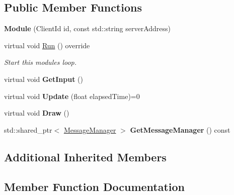 \subsection*{Public Member Functions}
\begin{DoxyCompactItemize}
\item 
\mbox{\label{classTarbora_1_1Module_a6d35f53c3259f4a55e1d66d17fc08e3e}} 
{\bfseries Module} (Client\+Id id, const std\+::string server\+Address)
\item 
virtual void \hyperlink{classTarbora_1_1Module_a62a1e7435f81e085354cbe603a023aee}{Run} () override
\begin{DoxyCompactList}\small\item\em Start this module\textquotesingle{}s loop. \end{DoxyCompactList}\item 
\mbox{\label{classTarbora_1_1Module_a92c5bea564ff0e9fd6bd6cf8509eb8fc}} 
virtual void {\bfseries Get\+Input} ()
\item 
\mbox{\label{classTarbora_1_1Module_a8097596a5bae0353c9b25dd670bb4d76}} 
virtual void {\bfseries Update} (float elapsed\+Time)=0
\item 
\mbox{\label{classTarbora_1_1Module_a2ee3849b4577b1ae705f9511d185588f}} 
virtual void {\bfseries Draw} ()
\item 
\mbox{\label{classTarbora_1_1Module_aca2361d57f02594db6c14749ae5af588}} 
std\+::shared\+\_\+ptr$<$ \hyperlink{classTarbora_1_1MessageManager}{Message\+Manager} $>$ {\bfseries Get\+Message\+Manager} () const
\end{DoxyCompactItemize}
\subsection*{Additional Inherited Members}


\subsection{Member Function Documentation}
\mbox{\label{classTarbora_1_1Module_a62a1e7435f81e085354cbe603a023aee}} 
